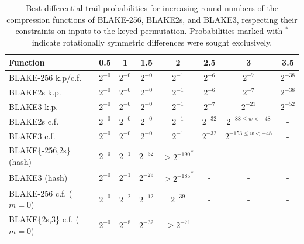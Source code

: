 \documentclass[11pt,notitlepage,a4paper]{article}
\begin{document}
\begin{table}[t]
  \centering
  \caption{Best differential trail probabilities for increasing round numbers of the compression functions of BLAKE-256, BLAKE2s, and BLAKE3, respecting their constraints on inputs to the keyed permutation. Probabilities marked with ${}^\ast$ indicate rotationally symmetric differences were sought exclusively.}%
  \label{tab:trails}
  \begin{tabular}{lccccccc}
    \toprule
    Function                       & 0.5      & 1        & 1.5       & 2                     & 2.5       & 3                               & 3.5        \\ \midrule
    BLAKE-256 k.p/c.f.             & $2^{-0}$ & $2^{-0}$ & $2^{-0}$  & $2^{-1}$              & $2^{-6}$  & $2^{-7}$                        & $2^{-38}$  \\
    BLAKE2s k.p.                   & $2^{-0}$ & $2^{-0}$ & $2^{-0}$  & $2^{-1}$              & $2^{-6}$  & $2^{-7}$                        & $2^{-38}$  \\
    BLAKE3 k.p.                    & $2^{-0}$ & $2^{-0}$ & $2^{-0}$  & $2^{-1}$              & $2^{-7}$  & $2^{-21}$                       & $2^{-52}$  \\
    BLAKE2s c.f.                   & $2^{-0}$ & $2^{-0}$ & $2^{-0}$  & $2^{-1}$              & $2^{-32}$ & $2^{-88\le w < -48}$            & -          \\
    BLAKE3 c.f.                    & $2^{-0}$ & $2^{-0}$ & $2^{-0}$  & $2^{-1}$              & $2^{-32}$ & $2^{-153 \le w < -48}$          & -          \\
    BLAKE\{-256,2s\} (hash)        & $2^{-0}$ & $2^{-1}$ & $2^{-32}$ & ${\ge 2^{-190}}^\ast$ & -         & -                               & -          \\ %
    BLAKE3 (hash)                  & $2^{-0}$ & $2^{-1}$ & $2^{-29}$ & ${\ge 2^{-185}}^\ast$ & -         & -                               & -          \\ %
    BLAKE-256 c.f. ($m=0$)         & $2^{-0}$ & $2^{-2}$ & $2^{-12}$ & $2^{-39}$             & -         & -                               & -          \\
    BLAKE\{2s,3\} c.f. ($m=0$)     & $2^{-0}$ & $2^{-8}$ & $2^{-32}$ & ${\ge 2^{-71}}$       & -         & -                               & -          \\ %
    \bottomrule
  \end{tabular}
\end{table}
\end{document}

